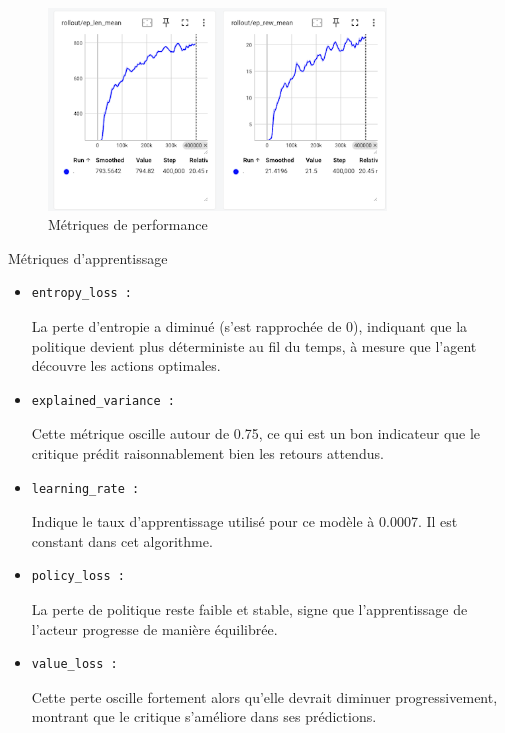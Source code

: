 \documentclass{article}
\begin{document}
        \begin{figure}[ht]
            \centering
            \includegraphics[width=0.8\textwidth]{7.png}
            \caption{Métriques de performance}
        \end{figure}
    
        Métriques d'apprentissage
        
        \begin{itemize} 
            \item \begin{verbatim}entropy_loss :\end{verbatim}La perte d'entropie a diminué (s’est rapprochée de 0), indiquant que la politique devient plus déterministe au fil du temps, à mesure que l'agent découvre les actions optimales.
            \item \begin{verbatim}explained_variance :\end{verbatim}Cette métrique oscille autour de 0.75, ce qui est un bon indicateur que le critique prédit raisonnablement bien les retours attendus.
            \item \begin{verbatim}learning_rate :\end{verbatim}Indique le taux d’apprentissage utilisé pour ce modèle à 0.0007. Il est constant dans cet algorithme.
            \item \begin{verbatim}policy_loss :\end{verbatim}La perte de politique reste faible et stable, signe que l'apprentissage de l'acteur progresse de manière équilibrée.
            \item \begin{verbatim}value_loss :\end{verbatim}Cette perte oscille fortement alors qu’elle devrait diminuer progressivement, montrant que le critique s'améliore dans ses prédictions.
        \end{itemize}
        
\end{document}

